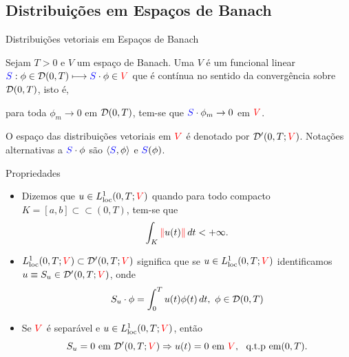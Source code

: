 \subsection*{Distribuições em Espaços de Banach}

\begin{frame}{Distribuições vetoriais em Espaços de Banach}
\begin{defin}
Sejam \(T>0\) e {\color{red}\(V\)} um espaço de Banach. Uma  {\color{red}\(V\)} é um {\color{blue}funcional linear} 
${\color{blue}S}: \phi\in \mathcal{D}(0,T)\longmapsto {{\color{blue}S}\cdot\phi}\in
{\color{red}V}$ que é {\color{blue}contínua} no sentido da convergência sobre $\mathcal{D}(0,T)$, isto é, 
\begin{center}
	para toda $\phi_m\to 0$ em $\mathcal{D}(0,T)$, tem-se que 
	${{\color{blue}S}\cdot\phi_m}\to 0$ em \({\color{red}V}\).
\end{center}


O espaço das distribuições vetoriais em \({\color{red}V}\)  é denotado por 
$\mathcal{D}'(0,T;{\color{red}V})$. Notações alternativas a \({\color{blue}S}\cdot \phi\) 
são \(\langle{\color{blue}S},\phi\rangle\) e \({\color{blue}S}(\phi)\).
\end{defin}
\end{frame}
\begin{frame}{Propriedades}

\begin{itemize}
\item Dizemos que \(u\in L_{\operatorname{loc}}^1(0,T;{\color{red}V})\) quando para todo compacto \(K=[a,b]\subset\subset (0,T)\), tem-se que
\[
\int_K \nr{u(t)}\,dt<+\infty.
\]

\item $L_{\operatorname{loc}}^1(0,T;{\color{red}V})\subset \mathcal{D}'(0,T;{\color{red}V})$ significa que se \(u\in L_{\operatorname{loc}}^1(0,T;{\color{red}V})\) identificamos \(u\equiv S_u\in \mathcal{D}'(0,T;{\color{red}V})\), onde 
\[{S_u\cdot\phi}=\int_0^T u(t)\phi(t)\,dt, \ \phi \in \mathcal{D}(0,T)\]

\item  Se \({\color{red}V}\) é separável e $u\in L_{\operatorname{loc}}^1(0,T;{\color{red}V})$, então
\[
S_u=0 \text{ em } \D'(0,T;{\color{red}V})\Rightarrow u(t)=0 \text{ em } {\color{red}V},\ \text{ q.t.p em} (0,T). 
\]
\end{itemize}
\end{frame}


